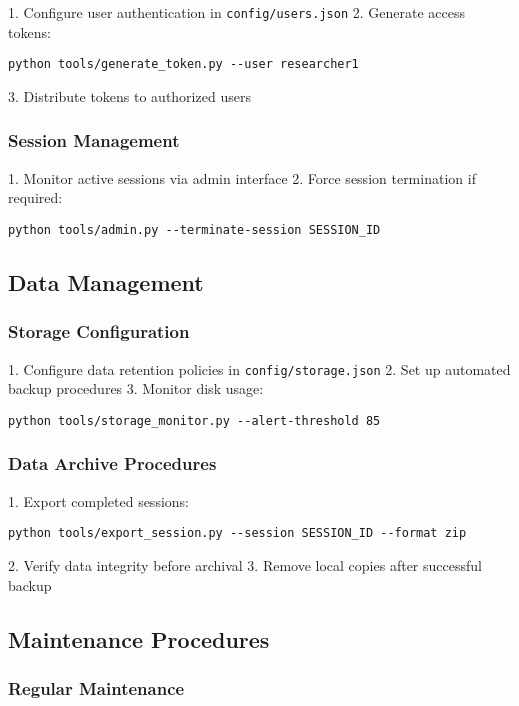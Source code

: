 1. Configure user authentication in \texttt{config/users.json}
2. Generate access tokens:
\begin{verbatim}
python tools/generate_token.py --user researcher1
\end{verbatim}
3. Distribute tokens to authorized users

\subsubsection{Session Management}

1. Monitor active sessions via admin interface
2. Force session termination if required:
\begin{verbatim}
python tools/admin.py --terminate-session SESSION_ID
\end{verbatim}

\subsection{Data Management}

\subsubsection{Storage Configuration}

1. Configure data retention policies in \texttt{config/storage.json}
2. Set up automated backup procedures
3. Monitor disk usage:
\begin{verbatim}
python tools/storage_monitor.py --alert-threshold 85
\end{verbatim}

\subsubsection{Data Archive Procedures}

1. Export completed sessions:
\begin{verbatim}
python tools/export_session.py --session SESSION_ID --format zip
\end{verbatim}
2. Verify data integrity before archival
3. Remove local copies after successful backup

\subsection{Maintenance Procedures}

\subsubsection{Regular Maintenance}

